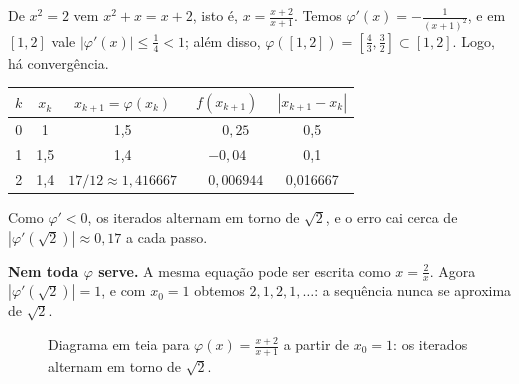 \begin{exemplo}[{: $f(x)=x^2-2$ com $\varphi(x)=\frac{x+2}{x+1}$ e $x_0=1$}]
De $x^2=2$ vem $x^2+x=x+2$, isto é, $x=\frac{x+2}{x+1}$. Temos
$\varphi'(x)=-\frac{1}{(x+1)^2}$, e em $[1,2]$ vale $|\varphi'(x)|\le\frac14<1$; além disso,
$\varphi([1,2])=[\frac43,\frac32]\subset[1,2]$. Logo, há convergência.
\begin{center}
\begin{tabular}{ccccc}
\toprule
$k$ & $x_k$ & $x_{k+1}=\varphi(x_k)$ & $f(x_{k+1})$ & $|x_{k+1}-x_k|$\\
\midrule
0 & 1 & 1{,}5 & $\phantom{-}0{,}25$ & 0{,}5\\
1 & 1{,}5 & 1{,}4 & $-0{,}04$ & 0{,}1\\
2 & 1{,}4 & $17/12\approx1{,}416667$ & $\phantom{-}0{,}006944$ & 0{,}016667\\
\bottomrule
\end{tabular}
\end{center}
Como $\varphi'<0$, os iterados alternam em torno de $\sqrt2$, e o erro cai cerca de
$|\varphi'(\sqrt2)|\approx0{,}17$ a cada passo.

\textbf{Nem toda $\varphi$ serve.} A mesma equação pode ser escrita como $x=\frac2x$. Agora
$|\varphi'(\sqrt2)|=1$, e com $x_0=1$ obtemos $2,1,2,1,\dots$: a sequência nunca se aproxima de
$\sqrt2$.
\end{exemplo}

\begin{figure}[h]
\centering
{}
\caption{Diagrama em teia para $\varphi(x)=\frac{x+2}{x+1}$ a partir de $x_0=1$:
os iterados alternam em torno de $\sqrt2$.}
\label{fig:teia}
\end{figure}

